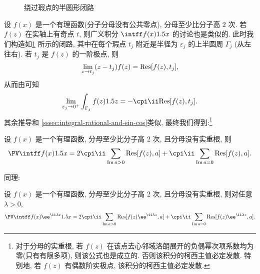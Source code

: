 \begin{figure}[!htb]
\begin{minipage}{.48\textwidth}
    \caption{绕过瑕点的半圆形闭路}
    \label{fig:half-circle-remove-singular-contour}
  \end{minipage}
\end{figure}

设 $f(x)$ 是一个有理函数(分子分母没有公共零点), 分母至少比分子高 $2$ 次.
若 $f(z)$ 在实轴上有奇点 $t$, 则广义积分 $\intff f(x)\d x$ 的讨论也是类似的.
此时我们构造如\ref{fig:half-circle-remove-singular-contour} 所示的闭路, 其中在每个瑕点 $t_j$ 附近是半径为 $\varepsilon_j$ 的上半圆周 $\Gamma_j$ (从左往右).
若 $t_j$ 是 $f(z)$ 的一阶极点, 则
\[
  \lim_{z\rightarrow t_j} (z-t_j)f(z)={\mathrm{Res}}[f(z),t_j],
\]
从而由\thmsa 可知
\[
  \lim_{\varepsilon_j\ra 0^+}\int_{\Gamma_j}f(z)\d z
  =-\cpi\ii\Res[f(z),t_j].
\]
其余推导和 \ref{sssec:integral-rational-and-sin-cos}类似, 最终我们得到:\footnote{
  对于分母的实重根, 若 $f(z)$ 在该点去心邻域洛朗展开的负偶幂次项系数均为零(只有有限多项), 则该公式也是成立的.
  否则该积分的柯西主值必定发散.
  特别地, 若 $f(z)$ 有偶数阶实极点, 该积分的柯西主值必定发散.
}

\begin{theorem}
  设 $f(x)$ 是一个有理函数, 分母至少比分子高 $2$ 次, 且分母没有实重根, 则
  \[
     \PV\intff f(x)\d x
    =2\cpi\ii\sum_{\Im a>0}\Res[f(z),a]
    +\cpi\ii\sum_{\Im a=0}\Res[f(z),a].
  \]
\end{theorem}
同理:
\begin{theorem}
  设 $f(x)$ 是一个有理函数, 分母至少比分子高 $2$ 次, 且分母没有实重根, 则对任意 $\lambda>0$,
  \[
     \PV\intff f(x)\ee^{\ii \lambda x}\d x
    =2\cpi\ii\sum_{\Im a>0}\Res[f(z)\ee^{\ii \lambda z},a]
    +\cpi\ii\sum_{\Im a=0}\Res[f(z)\ee^{\ii \lambda z},a].
  \]
\end{theorem}


